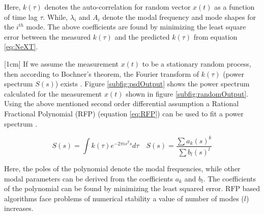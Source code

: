 Here, $k(\tau)$ denotes the auto-correlation for random vector $x(t)$ as a function of time lag $\tau$. While, $\lambda_{i}$ and $A_{i}$ denote the modal frequency and mode shapes for the $i^{th}$ mode. The above coefficients are found by minimizing the least square error between the measured $k(\tau)$ and the predicted $k(\tau)$ from equation \ref{eq:NeXT}.

[1cm]
If we assume the measurement $x(t)$ to be a stationary random process, then according to Bochner's theorem, the Fourier transform of $k(\tau)$ (power spectrum $S(s)$) exists \cite{bochner2016lectures}. Figure \ref{subfig:psdOutput} shows the power spectrum calculated for the measurement $x(t)$ shown in figure \ref{subfig:randomOutput}. Using the above mentioned second order differential assumption a Rational Fractional Polynomial (RFP) (equation \ref{eq:RFP}) can be used to fit a power spectrum \cite{richardson1982parameter, allemang1998unified, chauhan2007unified}.

\begin{equation}\label{eq:RFP}
S(s) = \int k(\tau) e^{-2 \pi is^{T} s}d\tau \quad    S(s) = \frac{\sum a_{k}(s)^{k}}{\sum b_{l}(s)^{l}}
\end{equation}

Here, the poles of the polynomial denote the modal frequencies, while other modal parameters can be derived from the coefficients $a_{k}$ and $b_{l}$. The coefficients of the polynomial can be found by minimizing the least squared error. RFP based algorithms face problems of numerical stability a value of number of modes ($l$) increases.

